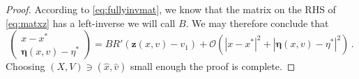 \documentclass[
	fontsize=11pt, 
	twoside=false, 
	abstract=true, 
	a4paper,
]{scrartcl}
\newcommand{\eps}{\varepsilon}
\newcommand{\CC}{\mathbb{C}}
\newcommand{\abs}[1]{\left\lvert#1\right\rvert}
\newcommand{\del}{\partial}
\begin{document}
\begin{proof}
	According to \cref{eq:fullyinvmat}, we know that the matrix on the RHS of \cref{eq:matxz} has a left-inverse we will call $B$. We may therefore conclude that 
	\[
		\begin{pmatrix} x-x^\ast \\ \bm{\eta}(x,v)-\eta^\ast \end{pmatrix} = BR'(\mathbf{z}(x,v)-v_1)+ \mathcal{O}(\abs{x-x^\ast}^2+\abs{\bm{\eta}(x,v)-\eta^\ast}^2)\,.
	\]
	Choosing $(X,V)\ni (\hat x, \hat v)$ small enough the proof is complete.
%
%

\end{proof}
\end{document}
